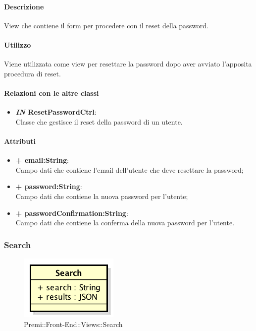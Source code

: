 	\paragraph{Descrizione}
	View che contiene il form per procedere con il reset della password.
	
	\paragraph{Utilizzo}
	Viene utilizzata come view per resettare la password dopo aver avviato l'apposita procedura di reset.
	
	\paragraph{Relazioni con le altre classi}
	\begin{itemize}
		\item \textbf{\textit{IN} ResetPasswordCtrl}:\\
		Classe che gestisce il reset della password di un utente.
	\end{itemize}
	
	\paragraph{Attributi}
	\begin{itemize}
		\item \textbf{+ email:String}: \\
		Campo dati che contiene l'email dell'utente che deve resettare la password;
		\item \textbf{+ password:String}: \\
		Campo dati che contiene la nuova password per l'utente;
		\item \textbf{+ passwordConfirmation:String}: \\
		Campo dati che contiene la conferma della nuova password per l'utente.
	\end{itemize}
\newpage
	

\subsubsection{Search}
	\begin{figure}[h]
		\centering
		\includegraphics[width=0.3\linewidth]{img/premi_front_end_views_search}
		\caption[Premi::Front-End::Views::Search]{Premi::Front-End::Views::Search}
	\end{figure}
	

